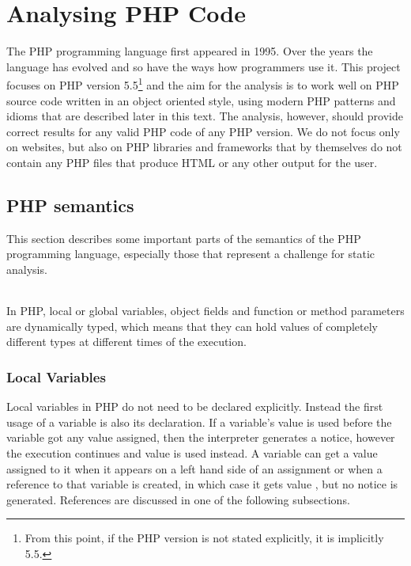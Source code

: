 
\chapter{Analysing PHP Code}

    The PHP programming language first appeared in 1995\cite{phphist}. Over the years 
    the language has evolved and so have the ways how programmers use it. 
    This project focuses on PHP version 5.5\footnote{From this point, 
    if the PHP version is not stated explicitly, it is implicitly 5.5.} 
    and the aim for the analysis 
    is to work well on PHP source code written in an object oriented style, 
    using modern PHP patterns and idioms that are described later in 
    this text. The analysis, however, should provide correct results for 
    any valid PHP code of any PHP version. We do not focus only on websites, but also on 
    PHP libraries and frameworks that by themselves do not contain 
    any PHP files that produce HTML or any other output for the user.
    
    \section{PHP semantics}
    This section describes some important parts of the semantics of 
    the PHP programming language, especially those that represent a 
    challenge for static analysis.
    
    \subparagraph*{}    
    In PHP, local or global variables, object fields and function or 
    method parameters are dynamically typed, which means that they 
    can hold values of completely different types at different 
    times of the execution.
    
    \subsection{Local Variables}
    Local variables in PHP do not need to be declared explicitly. 
    Instead the first usage of a variable is also its declaration. 
    If a variable's value is used before the variable got any 
    value assigned, then the interpreter generates a notice, 
    however the execution continues and value  is 
    used instead. A variable can get a value assigned to it when it 
    appears on a left hand side of an assignment or when a 
    reference to that variable is created, in which case it gets value 
    , but no notice is generated. References are 
    discussed in one of the following subsections.

